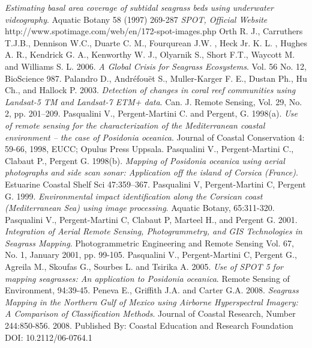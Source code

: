 \documentclass[10pt, a4paper]{article}
\begin{document}
\begin{thebibliography}{999}
\emph{Estimating basal area coverage of subtidal seagrass beds using underwater videography}.
Aquatic Botany 58 (1997) 269-287 \pageref{Noralez10}
\emph{SPOT, Official Website} http://www.spotimage.com/web/en/172-spot-images.php \pageref{SPOT}
Orth R. J., Carruthers T.J.B., Dennison W.C., Duarte C. M., Fourqurean J.W. , Heck Jr.
K. L. , Hughes A. R., Kendrick G. A., Kenworthy W. J., Olyarnik S., Short F.T., Waycott
M. and Williams S. L. 2006. \emph{A Global Crisis for Seagrass Ecosystems}. Vol. 56 No. 12,
BioScience 987. \pageref{Orth06}
Palandro D., Andréfouët S., Muller-Karger F. E., Dustan Ph., Hu Ch., and Hallock P.
2003. \emph{Detection of changes in coral reef communities using Landsat-5 TM and Landsat-7
ETM+ data}. Can. J. Remote Sensing, Vol. 29, No. 2, pp. 201–209. \pageref{Palandro03}
Pasqualini V., Pergent-Martini C. and Pergent, G. 1998(a). \emph{Use of remote sensing for the
characterization of the Mediterranean coastal environment – the case of Posidonia
oceanica}. Journal of Coastal Conservation 4: 59-66, 1998, EUCC; Opulus Press Uppsala. \pageref{Pasqualini98a}
Pasqualini V., Pergent-Martini C., Clabaut P., Pergent G. 1998(b). \emph{Mapping of
\textit{{Posidonia oceanica}} using aerial photographs and side scan sonar: Application off the
island of Corsica (France)}. Estuarine Coastal Shelf Sci 47:359–367. \pageref{Pasqualini98b}
Pasqualini V, Pergent-Martini C, Pergent G. 1999. \emph{Environmental impact identification
along the Corsican coast (Mediterranean Sea) using image processing}. Aquatic Botany,
65:311-320. \pageref{Pasqualini99}
Pasqualini V., Pergent-Martini C, Clabaut P, Marteel H., and Pergent G. 2001.
\emph{Integration of Aerial Remote Sensing, Photogrammetry, and GIS Technologies in Seagrass
Mapping}. Photogrammetric Engineering and Remote Sensing Vol. 67, No. 1, January 2001,
pp. 99-105. \pageref{Pasqualini01}
Pasqualini V., Pergent-Martini C, Pergent G., Agreila M., Skoufas G., Sourbes L. and
Tsirika A. 2005. \emph{Use of SPOT 5 for mapping seagrasses: An application to Posidonia
oceanica}. Remote Sensing of Environment, 94:39-45. \pageref{Pasqualini05}
Peneva E., Griffith J.A. and Carter G.A. 2008. \emph{Seagrass Mapping in the Northern Gulf
of Mexico using Airborne Hyperspectral Imagery: A Comparison of Classification Methods}.
Journal of Coastal Research, Number 244:850-856. 2008. Published By: Coastal Education
and Research Foundation DOI: 10.2112/06-0764.1 \pageref{Peneva08}

\end{thebibliography}
\end{document}
